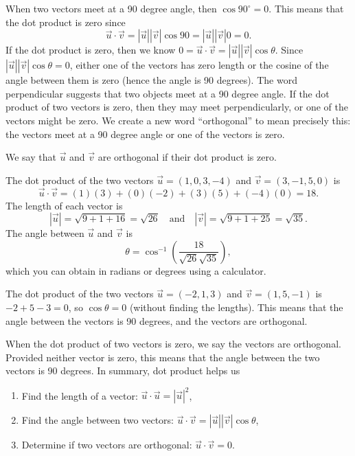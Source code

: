 When two vectors meet at a 90 degree angle, then $\cos 90^\circ = 0$.  
This means that the dot product is zero since $$\vec u \cdot \vec v = |\vec u||\vec v|\cos 90 = |\vec u||\vec v| 0=0.$$ 
If the dot product is zero, then we know $0=\vec u \cdot \vec v = |\vec u||\vec v|\cos \theta$. Since  $|\vec u||\vec v|\cos \theta=0$, either one of the vectors has zero length or the cosine of the angle between them is zero (hence the angle is 90 degrees). The word perpendicular suggests that two objects meet at a 90 degree angle. If the dot product of two vectors is zero, then they may meet perpendicularly, or one of the vectors might be zero. We create a new word ``orthogonal'' to mean precisely this: the vectors meet at a 90 degree angle or one of the vectors is zero.
\begin{definition}
We say that $\vec u$ and $\vec v$ are orthogonal if their dot product is zero. 
\end{definition}




\begin{example}
The dot product of the two vectors $\vec u = (1,0,3,-4)$ and $\vec v=(3,-1,5,0)$ is $$\vec u\cdot \vec v = (1)(3)+(0)(-2)+(3)(5)+(-4)(0) = 18.$$ 
The length of each vector is $$|\vec u| = \sqrt{9+1+16} = \sqrt{26}\quad\text{and}\quad|\vec v| = \sqrt{9+1+25} = \sqrt{35}.$$ 
The angle between $\vec u$ and $\vec v$ is $$\theta  = \cos ^{-1} \left(\frac{18}{\sqrt{26}\sqrt{35}}\right),$$ which you can obtain in radians or degrees using a calculator.

The dot product of the two vectors $\vec u = (-2,1,3)$ and $\vec v = (1,5,-1)$ is $-2+5-3=0$, so $\cos \theta = 0$ (without finding the lengths). This means that the angle between the vectors is 90 degrees, and the vectors are orthogonal.
\end{example}

When the dot product of two vectors is zero, we say the vectors are orthogonal. Provided neither vector is zero, this means that the angle between the two vectors is 90 degrees.  In summary, dot product helps us
\begin{enumerate}
	\item Find the length of a vector: $\vec u \cdot \vec u=|\vec u |^2$,
	\item Find the angle between two vectors: $\vec u \cdot \vec v = |\vec u||\vec v|\cos \theta$,
	\item Determine if two vectors are orthogonal: $\vec u \cdot \vec v = 0$.
\end{enumerate}
 
